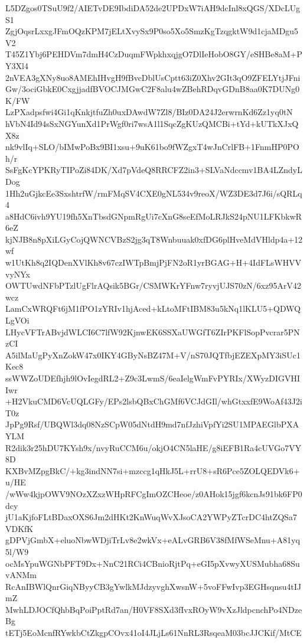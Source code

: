 L5DZgos0TSuU9f2/AIETvDE9IbdiDA52de2UPDxW7iAH9dcInl8xQGS/XDcLUgS1
ZgjOqsrLxxgJFmOQzKPM7jELtXvySx9P0so5Xo5SmzKgTzqgktW9d1cjaMDgu5V2
T45Z1Ybj6PEHDVm7dmH4CzDuqmFWpkhxqjgO7DlIeHobO8GY/eSHBe8aM+PY3Xl4
2nVEA3gXNy8uo8AMEhIHvgH9fBvcDblUsCptt63iZ0Xhv2GIt3qO9ZFELYtjJFni
Gw/3ociGbkE0CxgjjadfBVOCJMGwC2F8alu4wZBehRDqvGDnB8aa0K7DUNg0K/FW
LzPXadpsfwi4Gi1qKnkjtfuZh0uxDAwdW7Zl8/BIz0DA24J2erwrnKd6Zz1yq0tN
hVbN4Id94sSxNGYunXd1PrWgf0ri7wsA1l1SqcZgKUzQMCBi+tYd+kUTkXJxQX8z
nk9vlIq+SLO/bIMwPoBx9BI1xsu+9uK61bo9fWZgxT4wJnCrlFB+1FnmHP0POh/r
SsFgKcYPKRyTIPoZi84DK/Xd7pVdeQ8RRCFZ2in3+SLVaNdccmv1BA4LZndyLDog
1Hh2uGjkcEe3SxshtrfW/rmFMqSV4CXE0gNL534v9reoX/WZ3DE3d7J6i/sQRLq4
a8HdC6ivh9YU19fh5XnTbsdGNpmRgUi7cXnG8seEfMoLRJkS24pNU1LFKbkwR6eZ
kjNJB8n8pXiLGyCojQWNCVBzS2jg3qT8Wnbuuak0xfDG6plHveMdVHldp4a+12wf
w1UtKh8q2IQDenXVlKh8v67czIWTpBmjPjFN2oR1yrBGAG+H+4IdFLsWHVVvyNYx
OWTUwdNFbPTzlUgFlrAQsik5BGr/CSMWKrYFnw7ryvjUJS70zN/6xz95ArV42wcz
LamCxWRQFt6jM1fPO1zYRIv1hjAced+kLtoMFtIBM83u5kNq1lKLU5+QDWQLgVOi
LHycVFTrABvjdWLCI6C7lfW92KjnwEK6SSXaUWGfT6ZIrPKFlSopPvcrar5PNzCI
A5ilMaUgPyXnZokW47x0IKY4GByNsBZ47M+V/nS70JQTfbjEZEXpMY3iSUc1Kec8
ssWWZoUDEfhjh9lOvIegdRL2+Z9c3LwmS/6eaIelgWmFvPYRIx/XWyzDIGVHIIwr
+H2VkuCMD6VcUQLGFy/EPs2lsbQBxChGMf6VCJdGIl/whGtxxfE9WoAf43J2iT0z
JpPg9Rsf/UBQWl3dq08NzSCpW05dNtdH9md7nfJzhiVpfYi2SU1MPAEGlbPXAYLM
R2dik3r25hDU7KYsh9x/nvyRuCCM6u/okjO4CN5laHE/g8iEFB1Ra4cUVGo7VY8D
KXBvMZpgBkC/+kg3indNN7si+mzccg1qHkJ5L+rrU8+sR6Pce5ZOLQEDVk6+u/HE
/wWw4kjpOWV9NOzXZxzWHpRFCgImOZCHeoe/z0AHok15jgf6kcnJs91bk6FP0dcy
jU1aKjfoFLtBDaxOXS6Jm2dHKt2KnWuqWvXJsoCA2YWPyZTcrDC4htZQSa7VDKfK
gDPVjGmbX+eluoNbwWDjiTrLv8e2wkVx+eALvGRB6V38fMfWSeMnu+A81yq5l/W9
ocMsYpuWGNbPFT9Dx+NnC21RCi4CBnioRjtPq+eGI5pXvwyXUSMubha68SuvANMm
RcAnIBWlQnrGiqNByyCB3gYwlkMJdzyvghXwsnW+5voFFwIvp3EGHsqnsu4tIJmZ
MwhLDJOCfQhbBqPoiPptRd7an/H0VF8SXd3fIvxROyW9vXzJldpcnchPo4NDzeBg
tETj5EoMcnfRYwkbCtZkgpCOvx41oI4JLjLs61NnRL3RsqeaM03bcJJCKif/MtCE
